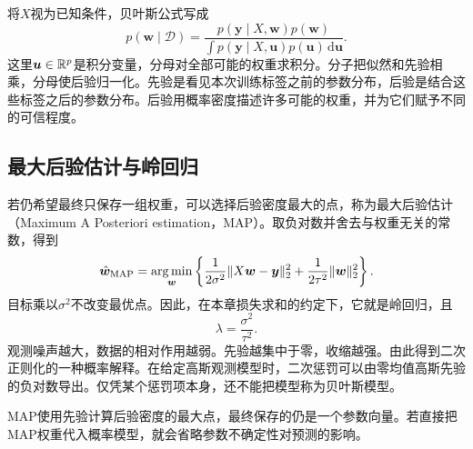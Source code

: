 将$X$视为已知条件，贝叶斯公式写成
\begin{equation}
 p(\bm w\mid\mathcal D)=
 \frac{p(\bm y\mid X,\bm w)p(\bm w)}
 {\int p(\bm y\mid X,\bm u)p(\bm u)\,\mathrm d\bm u}.
\end{equation}
这里$\bm u\in\mathbb{R}^p$是积分变量，分母对全部可能的权重求积分。分子把似然和先验相乘，分母使后验归一化。先验是看见本次训练标签之前的参数分布，后验是结合这些标签之后的参数分布。后验用概率密度描述许多可能的权重，并为它们赋予不同的可信程度。

\subsection{最大后验估计与岭回归}
若仍希望最终只保存一组权重，可以选择后验密度最大的点，称为最大后验估计（Maximum A Posteriori estimation，MAP）。取负对数并舍去与权重无关的常数，得到
\begin{equation}
 \hat{\bm w}_{\mathrm{MAP}}=\mathop{\mathrm{arg\,min}}_{\bm w}
 \left\{\frac1{2\sigma^2}\|X\bm w-\bm y\|_2^2
 +\frac1{2\tau^2}\|\bm w\|_2^2\right\}.
\end{equation}
目标乘以$\sigma^2$不改变最优点。因此，在本章损失求和的约定下，它就是岭回归，且
\begin{equation}
 \lambda=\frac{\sigma^2}{\tau^2}.
\end{equation}
观测噪声越大，数据的相对作用越弱。先验越集中于零，收缩越强。由此得到二次正则化的一种概率解释。在给定高斯观测模型时，二次惩罚可以由零均值高斯先验的负对数导出。仅凭某个惩罚项本身，还不能把模型称为贝叶斯模型。

MAP使用先验计算后验密度的最大点，最终保存的仍是一个参数向量。若直接把MAP权重代入概率模型，就会省略参数不确定性对预测的影响。

